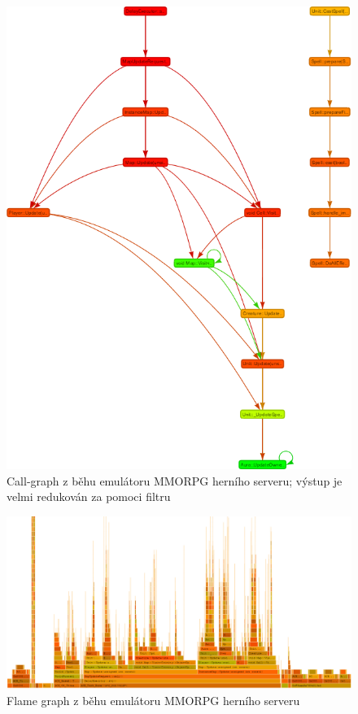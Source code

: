 \documentclass[czech,BP]{thesiskiv}
\begin{document}
\begin{figure}[h]
    \centering
    \includegraphics[interpolate,width=1.0\textwidth]{img/test-gcore-callgraph.png}
    \caption{Call-graph z běhu emulátoru MMORPG herního serveru; výstup je velmi redukován za pomoci filtru}
    \label{obr:testprefgraph-gcore}
\end{figure}

\begin{figure}
    \centering
    \includegraphics[interpolate,width=1.0\textwidth]{img/test-gcore-flame.png}
    \caption{Flame graph z běhu emulátoru MMORPG herního serveru}
    \label{obr:testprefflame-gcore}
\end{figure}
\end{document}
